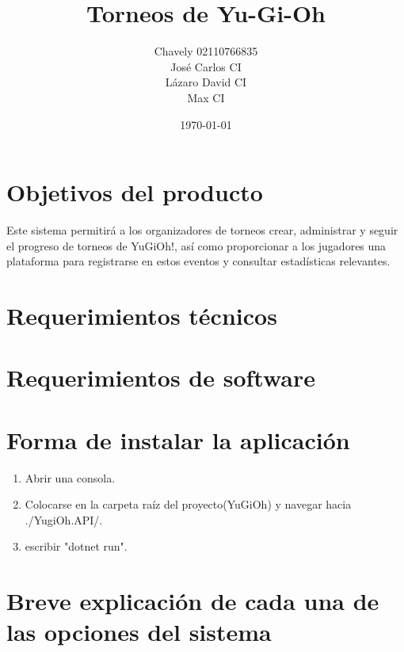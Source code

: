 \documentclass[a4paper]{article}
\begin{document}
\title{Torneos de Yu-Gi-Oh}
\author{
  \begin{tabular}{c}
    Chavely 02110766835 \\
    Jos\'e Carlos CI \\
    L\'azaro David CI \\
    Max CI
  \end{tabular}
}
\date{\today}
\maketitle
\newpage

\section{Objetivos del producto}
Este sistema permitirá a los organizadores de torneos crear, administrar y seguir el progreso de torneos de
YuGiOh!, as\'i como proporcionar a los jugadores una plataforma para registrarse en estos eventos y consultar
estad\'isticas relevantes.

\newpage

\section{Requerimientos t\'ecnicos}

\newpage

\section{Requerimientos de software}

\newpage

\section{Forma de instalar la aplicaci\'on}
\begin{enumerate}
\item Abrir una consola.
\item Colocarse en la carpeta ra\'iz del proyecto(YuGiOh) y navegar hacia ./YugiOh.API/.
\item escribir "dotnet run".
\end{enumerate}

\newpage

\section{Breve explicaci\'on de cada una de las opciones del sistema}
\end{document}
